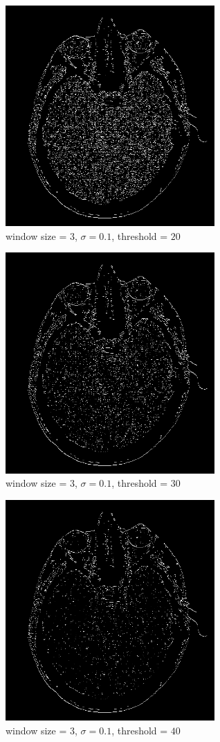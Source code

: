 \documentclass[conference]{IEEEtran}
\begin{document}
\begin{figure}[H]
\centerline{\includegraphics[width=8cm]{headCT01.png}}
\caption{window size = $3$, $\sigma=0.1$,  threshold = $20$}
\label{headCT01}
\end{figure}

\begin{figure}[H]
\centerline{\includegraphics[width=8cm]{headCT02.png}}
\caption{window size = $3$, $\sigma=0.1$,  threshold = $30$}
\label{len02}
\end{figure}

\begin{figure}[H]
\centerline{\includegraphics[width=8cm]{headCT03.png}}
\caption{window size = $3$, $\sigma=0.1$,  threshold = $40$}
\label{headCT03}
\end{figure}
\end{document}
